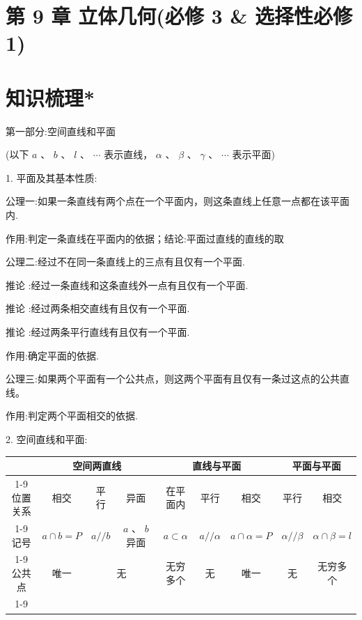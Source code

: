 
\section*{第 9 章 立体几何(必修 3 \& 选择性必修 1)}

\section*{知识梳理*}

第一部分:空间直线和平面

(以下 $a\text{ 、 }b\text{ 、 }l\text{ 、 }\cdots$ 表示直线， $\alpha \text{ 、 }\beta \text{ 、 }\gamma \text{ 、 }\cdots$ 表示平面)

1. 平面及其基本性质:

公理一:如果一条直线有两个点在一个平面内，则这条直线上任意一点都在该平面内.

作用:判定一条直线在平面内的依据；结论:平面过直线的直线的取

公理二:经过不在同一条直线上的三点有且仅有一个平面.

推论  :经过一条直线和这条直线外一点有且仅有一个平面.

推论  :经过两条相交直线有且仅有一个平面.

推论  :经过两条平行直线有且仅有一个平面.

作用:确定平面的依据.

公理三:如果两个平面有一个公共点，则这两个平面有且仅有一条过这点的公共直线。

作用:判定两个平面相交的依据.

2. 空间直线和平面:

\begin{center}
\begin{tabular}{|c|c|c|c|c|c|c|c|c|}
\hline
\phantom{X} & \multicolumn{3}{|c|}{空间两直线} & \multicolumn{3}{|c|}{直线与平面} & \multicolumn{2}{|c|}{平面与平面} \\
\cline{1-9}
位置关系 & 相交 & 平行 & 异面 & 在平面内 & 平行 & 相交 & 平行 & 相交 \\
\cline{1-9}
记号 & $a \cap  b = P$ & $a//b$ & $a\text{ 、 }b$ 异面 & $a \subset  \alpha$ & $a//\alpha$ & $a \cap  \alpha  = P$ & $\alpha //\beta$ & $\alpha  \cap  \beta  = l$ \\
\cline{1-9}
公共点 & 唯一 & \multicolumn{2}{|c|}{无} & 无穷多个 & 无 & 唯一 & 无 & 无穷多个 \\
\cline{1-9}
\hline
\end{tabular}
\end{center}

